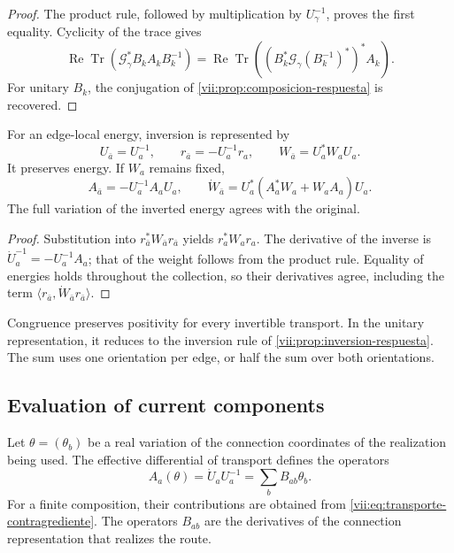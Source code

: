 \begin{proof}
The product rule, followed by multiplication by
\(U_\gamma^{-1}\), proves the first equality. Cyclicity of the
trace gives
\[
 \operatorname{Re}\operatorname{Tr}
  (\mathcal G_\gamma^*B_kA_kB_k^{-1})
 =\operatorname{Re}\operatorname{Tr}
  ((B_k^*\mathcal G_\gamma(B_k^{-1})^*)^*A_k).
\]
For unitary \(B_k\), the conjugation of
\ref{vii:prop:composicion-respuesta} is recovered.
\end{proof}

\begin{proposition}
\label{vii:prop:inversion-congruencia}
For an edge-local energy, inversion is represented by
\begin{equation}
 U_{\bar a}=U_a^{-1},\qquad
 r_{\bar a}=-U_a^{-1}r_a,\qquad
 W_{\bar a}=U_a^*W_aU_a.
 \label{vii:eq:inversion-peso-general}
\end{equation}
It preserves energy. If \(W_a\) remains fixed,
\[
 A_{\bar a}=-U_a^{-1}A_aU_a,\qquad
 \dot W_{\bar a}=U_a^*(A_a^*W_a+W_aA_a)U_a.
\]
The full variation of the inverted energy agrees with the original.
\end{proposition}

\begin{proof}
Substitution into \(r_{\bar a}^*W_{\bar a}r_{\bar a}\)
yields \(r_a^*W_ar_a\). The derivative of the inverse is
\(\dot U_a^{-1}=-U_a^{-1}A_a\); that of the weight follows
from the product rule. Equality of energies holds throughout the
collection, so their derivatives agree, including the term
\(\langle r_{\bar a},\dot W_{\bar a}r_{\bar a}\rangle\).
\end{proof}

Congruence preserves positivity for every invertible transport.
In the unitary representation, it reduces to the inversion rule of
\ref{vii:prop:inversion-respuesta}. The sum uses one orientation per
edge, or half the sum over both orientations.

\subsection{Evaluation of current components}

Let \(\theta=(\theta_b)\) be a real variation of the connection
coordinates of the realization being used. The effective differential
of transport defines the operators
\begin{equation}
 A_a(\theta)=\dot U_aU_a^{-1}
     =\sum_bB_{ab}\theta_b.
 \label{vii:eq:diferencial-conexion-transporte}
\end{equation}
For a finite composition, their contributions are obtained from
\eqref{vii:eq:transporte-contragrediente}. The operators
\(B_{ab}\) are the derivatives of the connection representation
that realizes the route.

